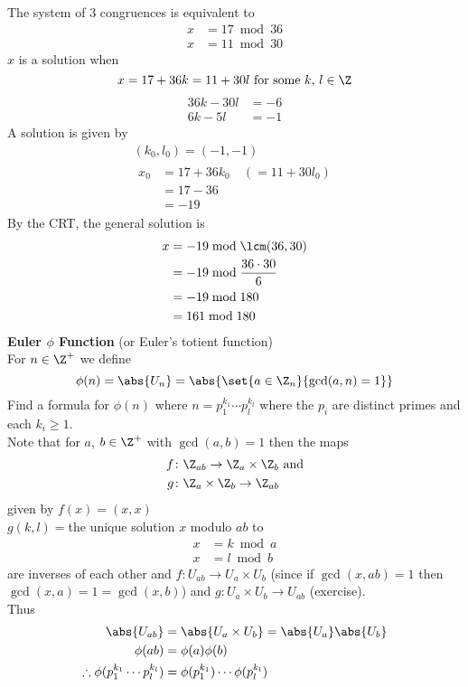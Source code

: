 The system of 3 congruences is equivalent to
\begin{align*}
x &= 17 \bmod 36 \\
x &= 11 \bmod 30
\end{align*}
$x$ is a solution when
\[ x = 17 + 36k = 11 + 30l \text{ for some $k$, $l\in\Z$} \]
\begin{align*}
36k - 30l &= -6 \\
6k - 5l &= -1
\end{align*}
A solution is given by
\begin{gather*}
(k_0,l_0) = (-1,-1) \\
\begin{aligned}
x_0 &= 17 + 36k_0 \quad (=11+30l_0) \\
&= 17 - 36 \\
&= -19
\end{aligned}
\end{gather*}
By the CRT, the general solution is
\begin{align*}
x &= -19 \bmod \lcm(36,30) \\
&= -19 \bmod \frac{36\cdot30}{6} \\
&= -19 \bmod 180 \\
&= 161 \bmod 180
\end{align*}
\textbf{Euler $\phi$ Function} (or Euler's totient function) \\
For $n\in\Z^+$ we define
\[ \phi(n) = \abs{U_n} = \abs{\set{a\in\Z_n}{\gcd(a,n)=1}} \]
\eg Find a formula for $\phi(n)$ where $n=p_1^{k_1}\dotsm p_l^{k_l}$ where the $p_i$ are distinct primes and each $k_i\geq1$. \\
\soln Note that for $a$, $b\in\Z^+$ with $\gcd(a,b)=1$ then the maps
\begin{align*}
f\colon &\Z_{ab} \to \Z_a \times \Z_b \text{ and} \\
g\colon &\Z_a\times\Z_b \to \Z_{ab}
\end{align*}
given by
$f(x)=(x,x)$ \\
$g(k,l)={}$the unique solution $x$ modulo $ab$ to
\begin{align*}
x &= k \bmod a \\
x &= l \bmod b
\end{align*}
are inverses of each other and $f\colon U_{ab}\to U_a\times U_b$ (since if $\gcd(x,ab)=1$ then $\gcd(x,a)=1=\gcd(x,b)$) and $g\colon U_a\times U_b\to U_{ab}$ (exercise). \\
Thus
\begin{align*}
\abs{U_{ab}} &= \abs{U_a\times U_b} = \abs{U_a}\abs{U_b} \\
\phi(ab) &= \phi(a) \phi(b) \\
\therefore \phi(p_1^{k_1}\dotsm p_l^{k_l}) &= \phi(p_1^{k_1})\dotsm\phi(p_l^{k_l})
\end{align*}
